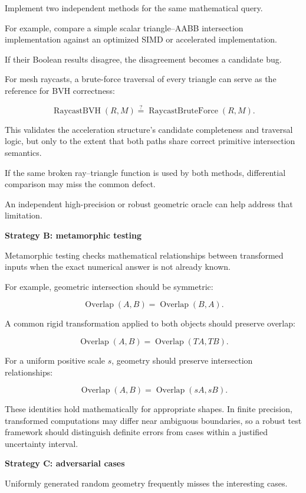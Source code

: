 Implement two independent methods for the same mathematical query.

For example, compare a simple scalar triangle--AABB intersection implementation against an optimized SIMD or accelerated implementation.

If their Boolean results disagree, the disagreement becomes a candidate bug.

For mesh raycasts, a brute-force traversal of every triangle can serve as the reference for BVH correctness:

\[
\operatorname{RaycastBVH}(R,M) \stackrel{?}{=} \operatorname{RaycastBruteForce}(R,M).
\]

This validates the acceleration structure's candidate completeness and traversal logic, but only to the extent that both paths share correct primitive intersection semantics.

If the same broken ray--triangle function is used by both methods, differential comparison may miss the common defect.

An independent high-precision or robust geometric oracle can help address that limitation.

\textbf{Strategy B: metamorphic testing}

Metamorphic testing checks mathematical relationships between transformed inputs when the exact numerical answer is not already known.

For example, geometric intersection should be symmetric:

\[
\operatorname{Overlap}(A,B) = \operatorname{Overlap}(B,A).
\]

A common rigid transformation applied to both objects should preserve overlap:

\[
\operatorname{Overlap}(A,B) = \operatorname{Overlap}(TA,TB).
\]

For a uniform positive scale \(s\), geometry should preserve intersection relationships:

\[
\operatorname{Overlap}(A,B) = \operatorname{Overlap}(sA,sB).
\]

These identities hold mathematically for appropriate shapes. In finite precision, transformed computations may differ near ambiguous boundaries, so a robust test framework should distinguish definite errors from cases within a justified uncertainty interval.

\textbf{Strategy C: adversarial cases}

Uniformly generated random geometry frequently misses the interesting cases.

